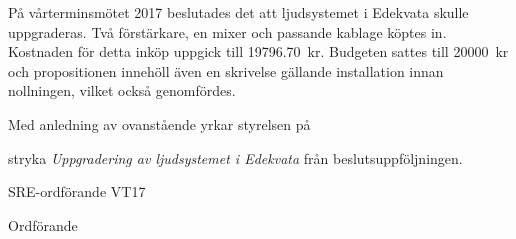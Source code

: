 \documentclass[../_main/handlingar.tex]{subfiles}
\begin{document}

På vårterminsmötet 2017 beslutades det att ljudsystemet i Edekvata skulle uppgraderas. Två förstärkare, en mixer och passande kablage köptes in. Kostnaden för detta inköp uppgick till \SI{19796.70}{kr}. Budgeten sattes till \SI{20000}{kr} och propositionen innehöll även en skrivelse gällande installation innan nollningen, vilket också genomfördes.


Med anledning av ovanstående yrkar styrelsen på

\begin{attsatser}
    \att stryka \emph{Uppgradering av ljudsystemet i Edekvata} från beslutsuppföljningen.
\end{attsatser}

\begin{signatures}{2}
    \mvh
	\signature{Pontus Landgren}{SRE-ordförande VT17}
    \signature{\ordf}{Ordförande}
\end{signatures}
\end{document}
